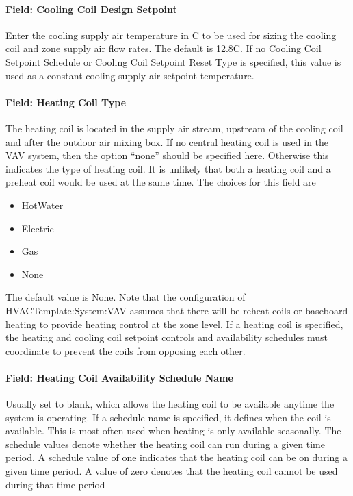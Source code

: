 \paragraph{Field: Cooling Coil Design Setpoint}\label{field-cooling-coil-design-setpoint-1}

Enter the cooling supply air temperature in C to be used for sizing the cooling coil and zone supply air flow rates. The default is 12.8C. If no Cooling Coil Setpoint Schedule or Cooling Coil Setpoint Reset Type is specified, this value is used as a constant cooling supply air setpoint temperature.

\paragraph{Field: Heating Coil Type}\label{field-heating-coil-type-4}

The heating coil is located in the supply air stream, upstream of the cooling coil and after the outdoor air mixing box. If no central heating coil is used in the VAV system, then the option ``none'' should be specified here. Otherwise this indicates the type of heating coil. It is unlikely that both a heating coil and a preheat coil would be used at the same time. The choices for this field are

\begin{itemize}
\item
  HotWater
\item
  Electric
\item
  Gas
\item
  None
\end{itemize}

The default value is None. Note that the configuration of HVACTemplate:System:VAV assumes that there will be reheat coils or baseboard heating to provide heating control at the zone level. If a heating coil is specified, the heating and cooling coil setpoint controls and availability schedules must coordinate to prevent the coils from opposing each other.

\paragraph{Field: Heating Coil Availability Schedule Name}\label{field-heating-coil-availability-schedule-name-4}

Usually set to blank, which allows the heating coil to be available anytime the system is operating. If a schedule name is specified, it defines when the coil is available. This is most often used when heating is only available seasonally. The schedule values denote whether the heating coil can run during a given time period. A schedule value of one indicates that the heating coil can be on during a given time period. A value of zero denotes that the heating coil cannot be used during that time period

